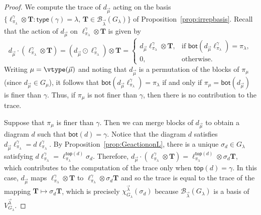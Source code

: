\begin{proof}
We compute the trace of $d_{\vec{\mu}}$ acting on the basis
$\{ \ell_{\pi_\lambda}^\gamma \otimes \mathbf{T} :
    \mathsf{type}(\gamma) = \lambda, \,
    \mathbf{T} \in \mathcal{B}_{\vec{\lambda}}(G_\lambda) \}$
of Proposition~\ref{prop:irrepbasis}.
Recall that the action of $d_{\vec{\mu}}$ on $\ell_{\pi_\lambda}^\gamma \otimes \mathbf{T}$
is given by
\begin{equation*}
    d_{\vec{\mu}} \cdot (\ell_{\pi_\lambda}^\gamma \otimes \mathbf{T})
    = (d_{\vec{\mu}} \odot \ell_{\pi_\lambda}^\gamma) \otimes \mathbf{T}
    =
    \begin{cases}
        d_{\vec{\mu}} \ell_{\pi_\lambda}^\gamma \otimes \mathbf{T}, & \text{if~} \mathsf{bot}(d_{\vec{\mu}} \ell_{\pi_\lambda}^\gamma) = \pi_\lambda,\\
        0, & \text{otherwise.}
    \end{cases}
\end{equation*}
Writing $\mu = \vtype(\vec{\mu})$ and noting that $d_{\vec{\mu}}$ is
a permutation of the blocks of $\pi_\mu$ (since $d_{\vec{\mu}} \in G_\mu$),
it follows that $\mathsf{bot}(d_{\vec{\mu}} \ell_{\pi_\lambda}^\gamma) = \pi_\lambda$
if and only if $\pi_\mu = \mathsf{bot}(d_{\vec{\mu}})$ is finer than $\gamma$.
Thus, if $\pi_\mu$ is not finer than $\gamma$, then there is no contribution to
the trace.

Suppose that $\pi_\mu$ is finer than $\gamma$. Then we can merge blocks of
$d_{\vec{\mu}}$ to obtain a diagram $d$ such that $\mathsf{bot}(d) = \gamma$.
Notice that the diagram $d$ satisfies
$d_{\vec{\mu}} \ell_{\pi_\lambda}^\gamma = d \ell_{\pi_\lambda}^\gamma$.
By Proposition~\ref{prop:GeactiononL}, there is a unique $\sigma_{d} \in G_\lambda$
satisfying $d \ell_{\pi_\lambda}^\gamma = \ell_{\pi_\lambda}^{\mathsf{top}(d)} \sigma_{d}$.
Therefore, $d_{\vec{\mu}} \cdot (\ell_{\pi_\lambda}^\gamma \otimes \mathbf{T})
= \ell_{\pi_\lambda}^{\mathsf{top}(d)} \otimes \sigma_{d} \mathbf{T}$,
which contributes to the computation of the trace only when $\mathsf{top}(d) = \gamma$.
In this case,
$d_{\vec{\mu}}$ maps $\ell_{\pi_\lambda}^\gamma \otimes \mathbf{T}$
to $\ell_{\pi_\lambda}^\gamma \otimes \sigma_d \mathbf{T}$ and so
the trace is equal to the trace of the mapping
$\mathbf{T} \mapsto \sigma_d \mathbf{T}$,
which is precisely $\chi^{\vec{\lambda}}_{G_\lambda}(\sigma_{d})$
because $\mathcal{B}_{\vec{\lambda}}(G_\lambda)$
is a basis of $V^{\vec{\lambda}}_{G_\lambda}$.
\end{proof}

